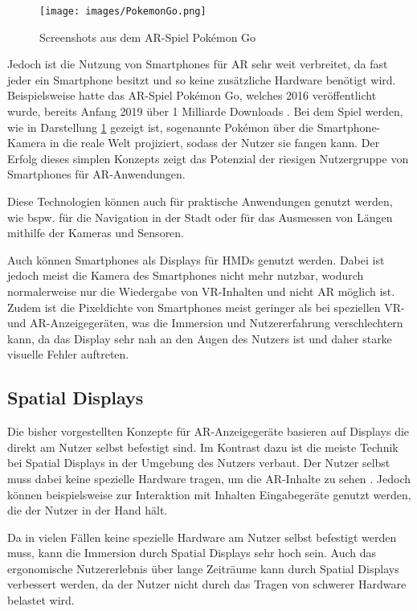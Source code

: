   \begin{figure}[H]
    \centering
    \texttt{[image: images/PokemonGo.png]}
    \caption{Screenshots aus dem AR-Spiel Pok\'emon Go}
    \label{fig:pokemon-go}
  \end{figure}

  Jedoch ist die Nutzung von Smartphones für AR sehr weit verbreitet, da fast jeder ein Smartphone besitzt und so keine zusätzliche Hardware benötigt wird.
  Beispielsweise hatte das AR-Spiel Pok\'emon Go, welches 2016 veröffentlicht wurde, bereits Anfang 2019 über 1 Milliarde Downloads \autocite[][]{pokemon-go-stats}.
  Bei dem Spiel werden, wie in Darstellung \ref*{fig:pokemon-go} gezeigt ist, sogenannte Pok\'emon über die Smartphone-Kamera in die reale Welt projiziert, sodass der Nutzer sie fangen kann.
  Der Erfolg dieses simplen Konzepts zeigt das Potenzial der riesigen Nutzergruppe von Smartphones für AR-Anwendungen.

  Diese Technologien können auch für praktische Anwendungen genutzt werden, wie bspw. für die Navigation in der Stadt oder für das Ausmessen von Längen mithilfe der Kameras und Sensoren.

  Auch können Smartphones als Displays für HMDs genutzt werden.
  Dabei ist jedoch meist die Kamera des Smartphones nicht mehr nutzbar, wodurch normalerweise nur die Wiedergabe von VR-Inhalten und nicht AR möglich ist.
  Zudem ist die Pixeldichte von Smartphones meist geringer als bei speziellen VR- und AR-Anzeigegeräten, was die Immersion und Nutzererfahrung verschlechtern kann, da das Display sehr nah an den Augen des Nutzers ist und daher starke visuelle Fehler auftreten.

  

  \subsection{Spatial Displays}

  Die bisher vorgestellten Konzepte für AR-Anzeigegeräte basieren auf Displays die direkt am Nutzer selbst befestigt sind.
  Im Kontrast dazu ist die meiste Technik bei Spatial Displays in der Umgebung des Nutzers verbaut.
  Der Nutzer selbst muss dabei keine spezielle Hardware tragen, um die AR-Inhalte zu sehen \autocite[]{bimber2006modern}.
  Jedoch können beispielsweise zur Interaktion mit Inhalten Eingabegeräte genutzt werden, die der Nutzer in der Hand hält.

  Da in vielen Fällen keine spezielle Hardware am Nutzer selbst befestigt werden muss, kann die Immersion durch Spatial Displays sehr hoch sein.
  Auch das ergonomische Nutzererlebnis über lange Zeiträume kann durch Spatial Displays verbessert werden, da der Nutzer nicht durch das Tragen von schwerer Hardware belastet wird.

